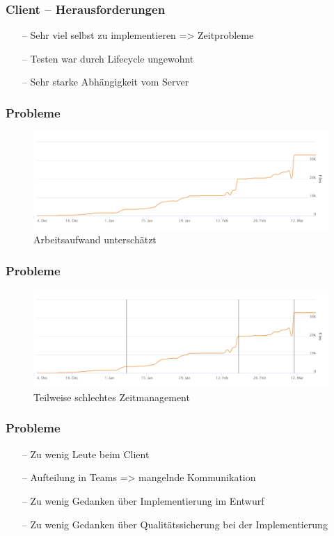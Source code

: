 \documentclass[aspectratio=1610]{beamer}
\begin{document}
\begin{frame}[plain]
      \frametitle{\textbf{Client} -- Herausforderungen}
	\begin{itemize} 
		\item[--] Sehr viel selbst zu implementieren => Zeitprobleme
		\item[--] Testen war durch Lifecycle ungewohnt 
		\item[--] Sehr starke Abhängigkeit vom Server 
	\end{itemize}
  \end{frame}


    \begin{frame}[plain]
    	\frametitle{\textbf{Probleme}}
     	\begin{figure}
      		\includegraphics[width = \columnwidth - 30pt]{images/loc.png}
		\caption{Arbeitsaufwand unterschätzt}
    	\end{figure}
    \end{frame}

     \begin{frame}[plain]
    	\frametitle{\textbf{Probleme}}
     	\begin{figure}
      		\includegraphics[width = \columnwidth - 30pt]{images/loc_deadlines.png}
		\caption{Teilweise schlechtes Zeitmanagement}
    	\end{figure}
    \end{frame}


    \begin{frame}[plain]
        \frametitle{\textbf{Probleme}}
        \begin{itemize}
            \item[--] Zu wenig Leute beim Client
            \item[--] Aufteilung in Teams => mangelnde Kommunikation
            \item[--] Zu wenig Gedanken über Implementierung im Entwurf
            \item[--] Zu wenig Gedanken über Qualitätssicherung bei der Implementierung
        \end{itemize}
    \end{frame}
\end{document}
